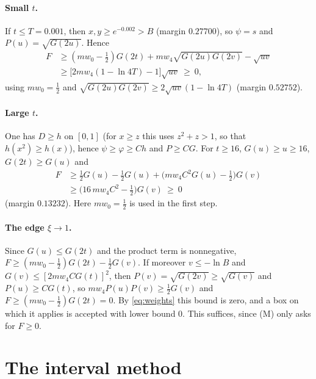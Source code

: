 \documentclass[12pt]{article}
\theoremstyle{plain}
\begin{document}
\paragraph*{Small $t$.} If $t\le T=0.001$, then $x,y\ge e^{-0.002}>B$ (margin $0.27700$), so $\psi=s$ and $P(u)=\sqrt{G(2u)}$. Hence
\begin{align*}
F&\ge(mw_0-\tfrac12)G(2t)+mw_4\sqrt{G(2u)G(2v)}-\sqrt{uv}\\
&\ge\bigl[2mw_4(1-\ln 4T)-1\bigr]\sqrt{uv}\ \ge\ 0,
\end{align*}
using $mw_0=\frac12$ and $\sqrt{G(2u)G(2v)}\ge 2\sqrt{uv}(1-\ln 4T)$ (margin $0.52752$).

\paragraph*{Large $t$.} One has $D\ge h$ on $[0,1]$ (for $x\ge z$ this uses $z^2+z>1$, so that $h(x^2)\ge h(x)$), hence $\psi\ge\varphi\ge Ch$ and $P\ge CG$. For $t\ge 16$, $G(u)\ge u\ge 16$, $G(2t)\ge G(u)$ and
\begin{align*}
F&\ge\tfrac12G(u)-\tfrac12G(u)+\bigl(mw_4C^2G(u)-\tfrac12\bigr)G(v)\\
&\ge\bigl(16\,mw_4C^2-\tfrac12\bigr)G(v)\ \ge\ 0
\end{align*}
(margin $0.13232$). Here $mw_0=\frac12$ is used in the first step.

\paragraph*{The edge $\xi\to1$.} Since $G(u)\le G(2t)$ and the product term is nonnegative, $F\ge(mw_0-\frac12)G(2t)-\frac12G(v)$. If moreover $v\le-\ln B$ and $G(v)\le[2mw_4CG(t)]^2$, then $P(v)=\sqrt{G(2v)}\ge\sqrt{G(v)}$ and $P(u)\ge CG(t)$, so $mw_4P(u)P(v)\ge\frac12G(v)$ and $F\ge(mw_0-\frac12)G(2t)=0$. By \eqref{eq:weights} this bound is zero, and a box on which it applies is accepted with lower bound $0$. This suffices, since (M) only asks for $F\ge 0$.

\section{The interval method}\label{app:interval}
\end{document}

